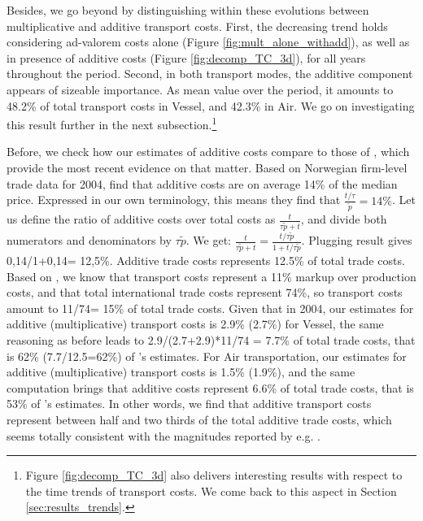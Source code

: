 \documentclass[a4paper,11pt]{article}
\begin{document}
Besides, we go beyond by distinguishing within these evolutions between multiplicative and additive transport costs. First, the decreasing trend holds considering ad-valorem costs alone (Figure \ref{fig:mult_alone_withadd}), as well as in presence of additive costs (Figure \ref{fig:decomp_TC_3d}), for all years throughout the period. Second, in both transport modes, the additive component appears of sizeable importance. As mean value over the period, it amounts to 48.2\% of total transport costs in Vessel, and 42.3\% in Air. We go on investigating this result further in the next subsection.\footnote{Figure \ref{fig:decomp_TC_3d} also delivers interesting results with respect to the time trends of transport costs. We come back to this aspect in Section \ref{sec:results_trends}.}

Before, we check how our estimates of additive costs compare to those of \citet{Irrazabal_2015}, which provide the most recent evidence on that matter. Based on Norwegian firm-level trade data for 2004, \citet{Irrazabal_2015} find that additive costs are on average 14\% of the median price. Expressed in our own terminology, this means they find that $\frac{t/\tau}{\widetilde{p}}=14\%$. Let us define the ratio of additive costs over total costs as $\frac{t}{\tau\widetilde{p}+t}$, and divide both numerators and denominators by $\tau\widetilde{p}$. We get: $\frac{t}{\tau\widetilde{p}+t}=\frac{t/\tau\widetilde{p}}{1+t/\tau\widetilde{p}}$. Plugging \citet{Irrazabal_2015} result gives 0,14/1+0,14= 12,5\%. Additive trade costs represents 12.5\% of total trade costs. Based on \citet{anderson_wincoop_jel}, we know that transport costs represent a 11\% markup over production costs, and that total international trade costs represent 74\%, so transport costs amount to 11/74= 15\% of total trade costs. Given that in 2004, our estimates for additive (multiplicative) transport costs is 2.9\% (2.7\%) for Vessel, the same reasoning as before leads to 2.9/(2.7+2.9)*11/74 = 7.7\% of total trade costs, that is 62\% (7.7/12.5=62\%) of \citet{Irrazabal_2015}'s estimates. For Air transportation, our estimates for additive (multiplicative) transport costs is 1.5\% (1.9\%), and the same computation brings that additive costs represent 6.6\% of total trade costs, that is 53\% of \citet{Irrazabal_2015}'s estimates. In other words, we find that additive transport costs represent between half and two thirds of the total additive trade costs, which seems totally consistent with the magnitudes reported by e.g. \citet{anderson_wincoop_jel}.
\end{document}
